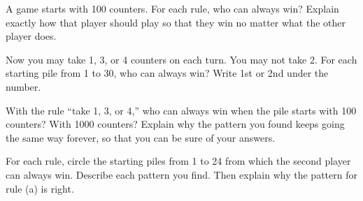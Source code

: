 \newpage
{} A game starts with 100 counters. For each rule, who can always win? Explain exactly how that player should play so that they win no matter what the other player does.

\vspace{5mm}

\vspace{95mm}

\newpage
{} Now you may take 1, 3, or 4 counters on each turn. You may not take 2. For each starting pile from 1 to 30, who can always win? Write 1st or 2nd under the number.

\vspace{1mm}
\begin{center}\end{center}

\vspace{10mm}
 With the rule “take 1, 3, or 4,” who can always win when the pile starts with 100 counters? With 1000 counters? Explain why the pattern you found keeps going the same way forever, so that you can be sure of your answers.

\vspace{5mm}
\hspace*{2.1em}\blank{4cm}

\vspace{5mm}
\hspace*{2.1em}\blank{4cm}

\newpage
{} For each rule, circle the starting piles from 1 to 24 from which the second player can always win. Describe each pattern you find. Then explain why the pattern for rule (a) is right.

\vspace{5mm}
\circles
\vspace{14mm}

\circles
\vspace{14mm}

\circles

